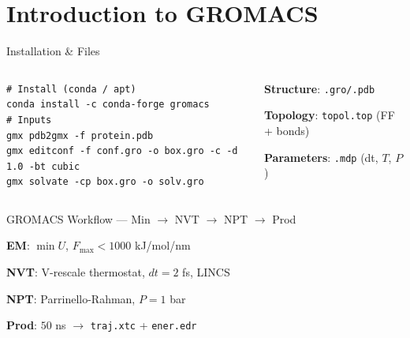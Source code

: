 \section{Introduction to GROMACS}

\begin{frame}[fragile]{Installation \& Files}
  \begin{columns}[T,onlytextwidth]
    \begin{verbatim}
# Install (conda / apt)
conda install -c conda-forge gromacs
# Inputs
gmx pdb2gmx -f protein.pdb
gmx editconf -f conf.gro -o box.gro -c -d 1.0 -bt cubic
gmx solvate -cp box.gro -o solv.gro
    \end{verbatim}
    \begin{pitemize}
      \item \textbf{Structure}: \texttt{.gro/.pdb}
      \item \textbf{Topology}: \texttt{topol.top} (FF + bonds)
      \item \textbf{Parameters}: \texttt{.mdp} (dt, $T$, $P$)
    \end{pitemize}
  \end{columns}
\end{frame}

\begin{frame}[fragile]{GROMACS Workflow --- Min \ensuremath{\rightarrow} NVT \ensuremath{\rightarrow} NPT \ensuremath{\rightarrow} Prod}
  \begin{center}
  \end{center}
  \begin{pitemize}
    \item \textbf{EM}: $\min U$, $F_{\max}<1000$ kJ/mol/nm
    \item \textbf{NVT}: V-rescale thermostat, $dt=2$ fs, LINCS
    \item \textbf{NPT}: Parrinello-Rahman, $P=1$ bar
    \item \textbf{Prod}: $50$ ns \ensuremath{\rightarrow} \texttt{traj.xtc} + \texttt{ener.edr}
  \end{pitemize}
\end{frame}

